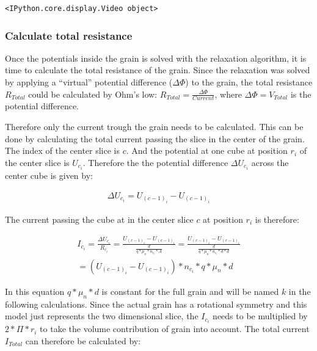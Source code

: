 \documentclass[11pt]{article}
\begin{document}
    
    \begin{verbatim}
<IPython.core.display.Video object>
    \end{verbatim}

    
    \hypertarget{calculate-total-resistance}{%
\subsubsection{Calculate total
resistance}\label{calculate-total-resistance}}

Once the potentials inside the grain is solved with the relaxation
algorithm, it is time to calculate the total resistance of the grain.
Since the relaxation was solved by applying a ``virtual'' potential
difference (\(\Delta\Phi\)) to the grain, the total resistance
\(R_{Total}\) could be calculated by Ohm's low:
\(R_{Total} = \frac{\Delta \Phi}{Current}\), where
\(\Delta \Phi = V_{Total}\) is the potential difference.

Therefore only the current trough the grain needs to be calculated. This
can be done by calculating the total current passing the slice in the
center of the grain. The index of the center slice is \(c\). And the
potential at one cube at position \(r_i\) of the center slice is
\(U_{c_i}\). Therefore the the potential difference \(\Delta U_{c_i}\)
across the center cube is given by:

\begin{align}
\Delta U_{c_i} = U_{(c-1)_{i}}-U_{(c-1)_{i}}
\end{align}

The current passing the cube at in the center slice \(c\) at position
\(r_i\) is therefore:

\begin{align}
I_{c_i} = \frac{\Delta U_{c_i}}{R_{c_i}} = \frac {U_{(c-1)_{i}}-U_{(c-1)_{i}}} {\frac{d}{q*\mu_n*n_{c_i}*A}}= \frac {U_{(c-1)_{i}}-U_{(c-1)_{i}}} {\frac{d}{q*\mu_n*n_{c_i}*d*d}}\\
= (U_{(c-1)_{i}}-U_{(c-1)_{i}})* n_{c_i} * q*\mu_n*d
\end{align}

In this equation \(q*\mu_n*d\) is constant for the full grain and will
be named \(k\) in the following calculations. Since the actual grain has
a rotational symmetry and this model just represents the two dimensional
slice, the \(I_{c_i}\) needs to be multiplied by \(2*\Pi*r_i\) to take
the volume contribution of grain into account. The total current
\(I_{Total}\) can therefore be calculated by:
\end{document}
